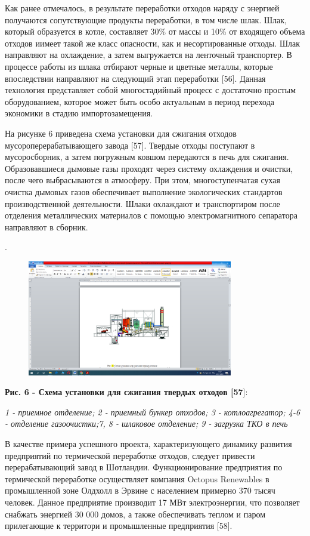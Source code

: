 Как ранее отмечалось, в результате переработки отходов наряду с энергией
получаются сопутствующие продукты переработки, в том числе шлак. Шлак,
который образуется в котле, составляет 30\% от массы и 10\% от входящего
объема отходов иимеет такой же класс опасности, как и несортированные
отходы. Шлак направляют на охлаждение, а затем выгружается на ленточный
транспортер. В процессе работы из шлака отбирают черные и цветные
металлы, которые впоследствии направляют на следующий этап переработки
{[}56{]}. Данная технология представляет собой многостадийный процесс с
достаточно простым оборудованием, которое может быть особо актуальным в
период перехода экономики в стадию импортозамещения.

На рисунке 6 приведена схема установки для сжигания отходов
мусороперерабатывающего завода {[}57{]}. Твердые отходы поступают в
мусоросборник, а затем погружным ковшом передаются в печь для сжигания.
Образовавшиеся дымовые газы проходят через систему охлаждения и очистки,
после чего выбрасываются в атмосферу. При этом, многоступенчатая сухая
очистка дымовых газов обеспечивает выполнение экологических стандартов
производственной деятельности. Шлаки охлаждают и транспортиром после
отделения металлических материалов с помощью электромагнитного
сепаратора направляют в сборник.

.


\begin{figure}[H]
	\centering
	\includegraphics[width=0.8\textwidth]{media/chem2/image69}
	\caption*{}
\end{figure}
{\bfseries Рис.
6 - Схема установки для сжигания твердых отходов {[}57}{]}:

\emph{1 - приемное отделение; 2 - приемный бункер отходов; 3 -
котлоагрегатор; 4-6 - отделение газоочистки;7, 8 - шлаковое отделение; 9
- загрузка ТКО в печь}

В качестве примера успешного проекта, характеризующего динамику развития
предприятий по термической переработке отходов, следует привести
перерабатывающий завод в Шотландии. Функционирование предприятия по
термической переработке осуществляет компания Octopus Renewables в
промышленной зоне Олдхолл в Эрвине с населением примерно 370 тысяч
человек. Данное предприятие производит 17 МВт электроэнергии, что
позволяет снабжать энергией 30 000 домов, а также обеспечивать теплом и
паром прилегающие к территори и промышленные предприятия {[}58{]}.

